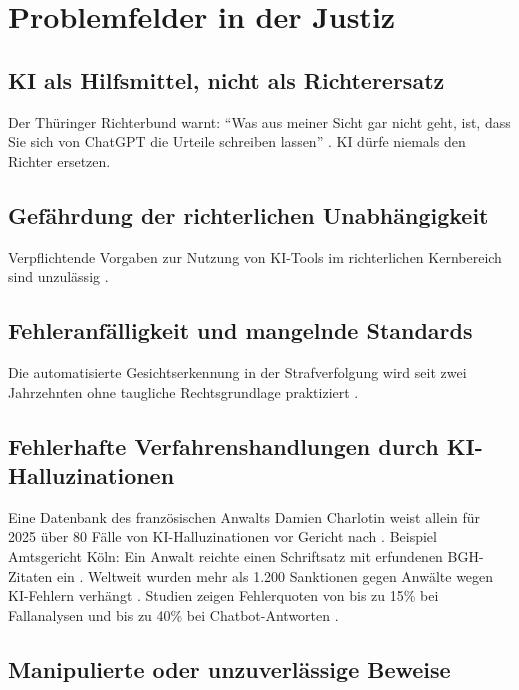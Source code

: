 \documentclass[12pt,a4paper]{article}
\begin{document}
	\section{Problemfelder in der Justiz}
	
	\subsection{KI als Hilfsmittel, nicht als Richterersatz}
	
	Der Thüringer Richterbund warnt: \enquote{Was aus meiner Sicht gar nicht geht, ist, dass Sie sich von ChatGPT die Urteile schreiben lassen} \cite{SZ2025}. KI dürfe niemals den Richter ersetzen.
	
	\subsection{Gefährdung der richterlichen Unabhängigkeit}
	
	Verpflichtende Vorgaben zur Nutzung von KI-Tools im richterlichen Kernbereich sind unzulässig \cite{Anwaltsblatt2025}.
	
	\subsection{Fehleranfälligkeit und mangelnde Standards}
	
	Die automatisierte Gesichtserkennung in der Strafverfolgung wird seit zwei Jahrzehnten ohne taugliche Rechtsgrundlage praktiziert \cite{Nomos2025}.
	
	\subsection{Fehlerhafte Verfahrenshandlungen durch KI-Halluzinationen}
	
	Eine Datenbank des französischen Anwalts Damien Charlotin weist allein für 2025 über 80 Fälle von KI-Halluzinationen vor Gericht nach \cite{Charlotin2025}. Beispiel Amtsgericht Köln: Ein Anwalt reichte einen Schriftsatz mit erfundenen BGH-Zitaten ein \cite{LTO2025a}. Weltweit wurden mehr als 1.200 Sanktionen gegen Anwälte wegen KI-Fehlern verhängt \cite{NPR2025}. Studien zeigen Fehlerquoten von bis zu 15\% bei Fallanalysen und bis zu 40\% bei Chatbot-Antworten \cite{LTO2025b, heise2025}.
	
	\subsection{Manipulierte oder unzuverlässige Beweise}
	
\end{document}
